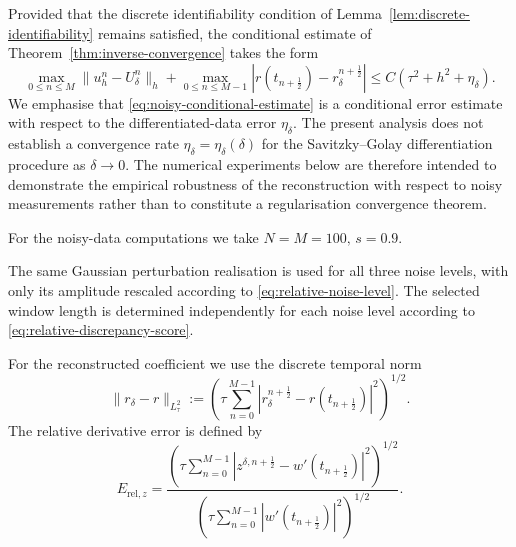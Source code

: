 \documentclass[reqno]{amsart}
\begin{document}
Provided that the discrete identifiability condition of
Lemma~\ref{lem:discrete-identifiability} remains satisfied, the
conditional estimate of
Theorem~\ref{thm:inverse-convergence} takes the form
\begin{equation}
\max_{0\le n\le M}
\|u_h^n-U_\delta^n\|_h
+
\max_{0\le n\le M-1}
\left|
r(t_{n+\frac12})
-
r_\delta^{n+\frac12}
\right|
\le
C\left(
\tau^2+h^2+\eta_\delta
\right).
\label{eq:noisy-conditional-estimate}
\end{equation}
We emphasise that
\eqref{eq:noisy-conditional-estimate} is a conditional error estimate
with respect to the differentiated-data error \(\eta_\delta\).
The present analysis does not establish a convergence rate
\(\eta_\delta=\eta_\delta(\delta)\) for the Savitzky--Golay
differentiation procedure as \(\delta\to0\). The numerical experiments
below are therefore intended to demonstrate the empirical robustness
of the reconstruction with respect to noisy measurements rather than
to constitute a regularisation convergence theorem.

For the noisy-data computations we take
$N=M=100,
\,
s=0.9.$

The same Gaussian perturbation realisation is used for all three
noise levels, with only its amplitude rescaled according to
\eqref{eq:relative-noise-level}. The selected window length is
determined independently for each noise level according to
\eqref{eq:relative-discrepancy-score}.

For the reconstructed coefficient we use the discrete temporal norm
\begin{equation}
\|r_\delta-r\|_{L_\tau^2}
:=
\left(
\tau
\sum_{n=0}^{M-1}
\left|
r_\delta^{n+\frac12}
-
r(t_{n+\frac12})
\right|^2
\right)^{1/2}.
\label{eq:r-L2tau}
\end{equation}
The relative derivative error is defined by
\begin{equation}
E_{\mathrm{rel},z}
=
\frac{
\left(
\tau
\sum_{n=0}^{M-1}
|z^{\delta,n+\frac12}
-w'(t_{n+\frac12})|^2
\right)^{1/2}
}{
\left(
\tau
\sum_{n=0}^{M-1}
|w'(t_{n+\frac12})|^2
\right)^{1/2}
}.
\label{eq:relative-z-error}
\end{equation}
\end{document}
